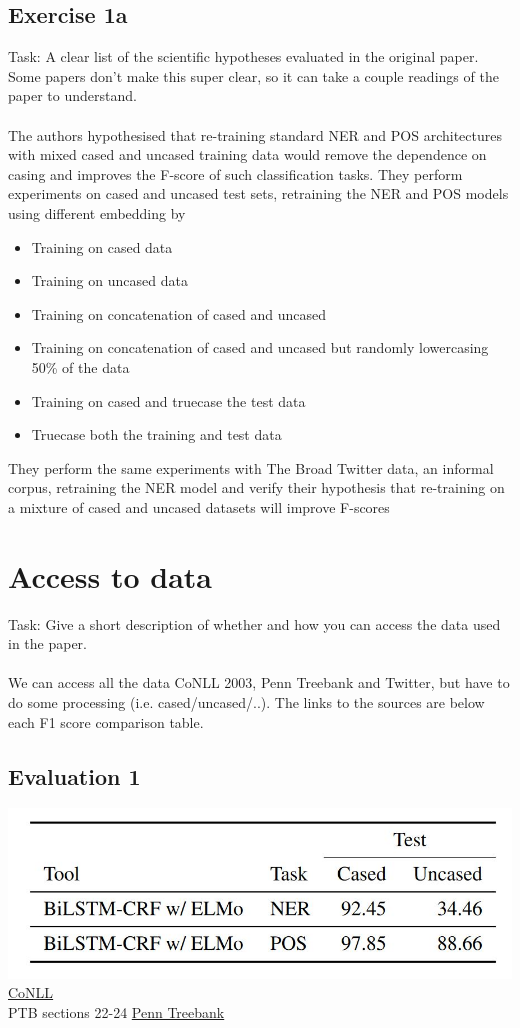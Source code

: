 \documentclass{article}
\begin{document}
\subsection*{Exercise 1a}
Task: A clear list of the scientific hypotheses evaluated in the original paper. Some papers don't make this super clear, so it can take a couple readings of the paper to understand.
\\
\\
The authors hypothesised that re-training standard NER and POS architectures with mixed cased and uncased training data would remove the dependence on casing and improves the F-score of such classification tasks. They perform experiments on cased and uncased test sets, retraining the NER and POS models using different embedding by 
\begin{itemize}
    \item Training on cased data
    \item Training on uncased data
    \item Training on concatenation of cased and uncased
    \item Training on concatenation of cased and uncased but randomly lowercasing 50\% of the data
    \item Training on cased and truecase the test data
    \item Truecase both the training and test data
\end{itemize}

They perform the same experiments with The Broad Twitter data, an informal corpus, retraining the NER model and verify their hypothesis that re-training on a mixture of cased and uncased datasets will improve F-scores

\section{Access to data}
Task: Give a short description of whether and how you can access the data used in the paper.
\\
\\
We can access all the data CoNLL 2003, Penn Treebank and Twitter, but have to do some processing (i.e. cased/uncased/..). The links to the sources are below each F1 score comparison table.


\subsection*{Evaluation 1}
\includegraphics{stat1}
\\
\href{https://dl.acm.org/doi/10.3115/1119176.1119195}{CoNLL}
\\
PTB sections 22-24 \href{https://www.seas.upenn.edu/~pdtb/}{Penn Treebank}
\end{document}
